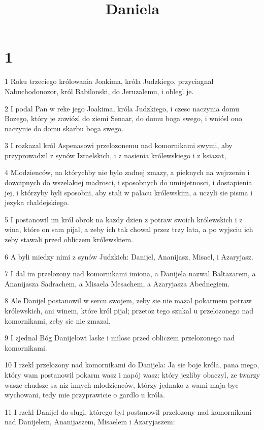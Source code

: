 

\title{Daniela}


\chapter{1}

\par 1 Roku trzeciego królowania Joakima, króla Judzkiego, przyciagnal Nabuchodonozor, król Babilonski, do Jeruzalemu, i oblegl je.
\par 2 I podal Pan w reke jego Joakima, króla Judzkiego, i czesc naczynia domu Bozego, który je zawiózl do ziemi Senaar, do domu boga swego, i wniósl ono naczynie do domu skarbu boga swego.
\par 3 I rozkazal król Aspenasowi przelozonemu nad komornikami swymi, aby przyprowadzil z synów Izraelskich, i z nasienia królewskiego i z ksiazat,
\par 4 Mlodzienców, na którychby nie bylo zadnej zmazy, a pieknych na wejrzeniu i dowcipnych do wszelakiej madrosci, i sposobnych do umiejetnosci, i dostapienia jej, i którzyby byli sposobni, aby stali w palacu królewskim, a uczyli sie pisma i jezyka chaldejskiego.
\par 5 I postanowil im król obrok na kazdy dzien z potraw swoich królewskich i z wina, które on sam pijal, a zeby ich tak chowal przez trzy lata, a po wyjsciu ich zeby stawali przed obliczem królewskiem.
\par 6 A byli miedzy nimi z synów Judzkich: Danijel, Ananijasz, Misael, i Azaryjasz.
\par 7 I dal im przelozony nad komornikami imiona, a Danijela nazwal Baltazarem, a Ananijasza Sadrachem, a Misaela Mesachem, a Azaryjasza Abednegiem.
\par 8 Ale Danijel postanowil w sercu swojem, zeby sie nie mazal pokarmem potraw królewskich, ani winem, które król pijal; przetoz tego szukal u przelozonego nad komornikami, zeby sie nie zmazal.
\par 9 I zjednal Bóg Danijelowi laske i milosc przed obliczem przelozonego nad komornikami.
\par 10 I rzekl przelozony nad komornikami do Danijela: Ja sie boje króla, pana mego, który wam postanowil pokarm wasz i napój wasz: który jezliby obaczyl, ze twarzy wasze chudsze sa niz innych mlodzienców, którzy jednako z wami maja byc wychowani, tedy mie przyprawicie o gardlo u króla.
\par 11 I rzekl Danijel do slugi, którego byl postanowil przelozony nad komornikami nad Danijelem, Ananijaszem, Misaelem i Azaryjaszem:
